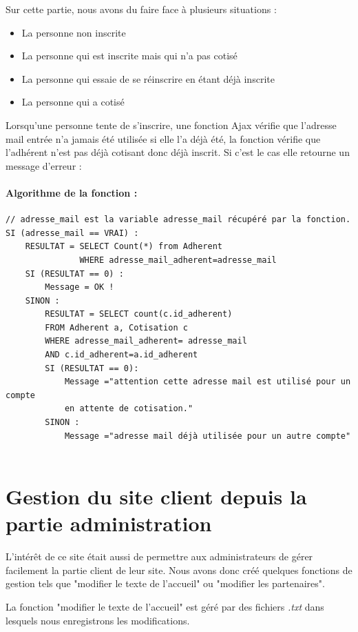 \documentclass[11pt,a4paper,titlepage]{report}
\begin{document}
Sur cette partie, nous avons du faire face à plusieurs situations :
\begin{itemize}
\item La personne non inscrite
\item La personne qui est inscrite mais qui n'a pas cotisé
\item La personne qui essaie de se réinscrire en étant déjà inscrite
\item La personne qui a cotisé
\end{itemize}

Lorsqu'une personne tente de s'inscrire, une fonction Ajax vérifie que l'adresse mail entrée n'a jamais été utilisée si elle l'a déjà été, la fonction vérifie que l'adhérent n'est pas déjà cotisant donc déjà inscrit. Si c'est le cas elle retourne un message d'erreur :
\\
\paragraph{Algorithme de la fonction :}
\begin{verbatim}
// adresse_mail est la variable adresse_mail récupéré par la fonction.
SI (adresse_mail == VRAI) :
    RESULTAT = SELECT Count(*) from Adherent
               WHERE adresse_mail_adherent=adresse_mail
    SI (RESULTAT == 0) :
        Message = OK ! 
    SINON :
        RESULTAT = SELECT count(c.id_adherent)
        FROM Adherent a, Cotisation c
        WHERE adresse_mail_adherent= adresse_mail 
        AND c.id_adherent=a.id_adherent
        SI (RESULTAT == 0):
            Message ="attention cette adresse mail est utilisé pour un compte
            en attente de cotisation." 
        SINON :
            Message ="adresse mail déjà utilisée pour un autre compte"
		
\end{verbatim}


\section{Gestion du site client depuis la partie administration}
L'intérêt de ce site était aussi de permettre aux administrateurs de gérer facilement la partie client de leur site. Nous avons donc créé quelques fonctions de gestion tels que "modifier le texte de l'accueil" ou "modifier les partenaires". 

La fonction "modifier le texte de l'accueil" est géré par des fichiers \textit{.txt} dans lesquels nous enregistrons les modifications.
\end{document}
